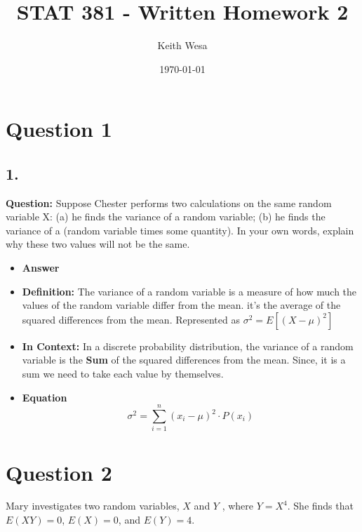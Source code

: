 \documentclass{article}
\author{Keith Wesa}
\title{STAT 381 - Written Homework 2}
\date{\today}
\begin{document}
\section*{Question 1}
\subsection*{1.}
\textbf{Question:} Suppose Chester performs two calculations on the same random variable X: (a) he finds
the variance of a random variable; (b) he finds the variance of a (random variable times
some quantity). In your own words, explain why these two values will not be the same.

\begin{itemize}
    \item[] \textbf{Answer} 
    \item \textbf{Definition:} The variance of a random variable is a measure of how much the values of the random variable differ from the mean. 
    it's the average of the squared differences from the mean. Represented as $\sigma^2 = E[(X - \mu)^2]$
    \item \textbf{In Context:} In a discrete probability distribution, the variance of a random variable is the \textbf{Sum} of the squared differences from the mean.
    Since, it is a sum we need to take each value by themselves.
    \item \textbf{Equation}
    \begin{equation*}
        \sigma^2 = \sum_{i=1}^{n} (x_i - \mu)^2 \cdot P(x_i)
        \end{equation*}
\end{itemize}
\section*{Question 2}
Mary investigates two random variables, $X$ and $Y$ , where $Y = X^4$. She finds that
$E(XY ) = 0$, $E(X) = 0$, and $E(Y) = 4$.
\end{document}
